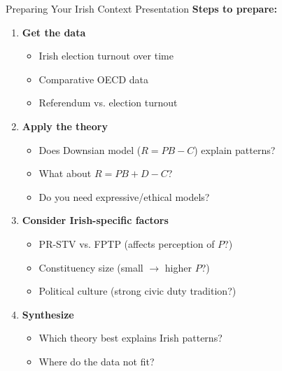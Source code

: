 \documentclass[10pt]{beamer}
\begin{document}
\begin{frame}{Preparing Your Irish Context Presentation}
\textbf{Steps to prepare:}



\begin{enumerate}
\item \textbf{Get the data}
\begin{itemize}
\item Irish election turnout over time
\item Comparative OECD data
\item Referendum vs. election turnout
\end{itemize}

\item \textbf{Apply the theory}
\begin{itemize}
\item Does Downsian model ($R = PB - C$) explain patterns?
\item What about $R = PB + D - C$?
\item Do you need expressive/ethical models?
\end{itemize}

\item \textbf{Consider Irish-specific factors}
\begin{itemize}
\item PR-STV vs. FPTP (affects perception of $P$?)
\item Constituency size (small $\rightarrow$ higher $P$?)
\item Political culture (strong civic duty tradition?)
\end{itemize}

\item \textbf{Synthesize}
\begin{itemize}
\item Which theory best explains Irish patterns?
\item Where do the data not fit?
\end{itemize}
\end{enumerate}
\end{frame}
\end{document}
